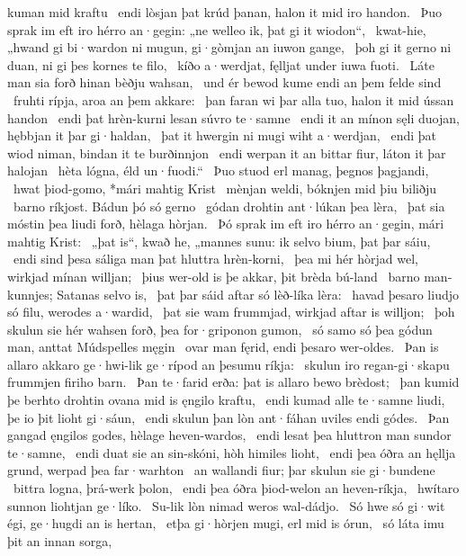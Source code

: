 kuman mid kraftu \hld\ endi lòsjan þat krúd þanan,
halon it mid iro handon. \hld\ Þuo sprak im eft iro hérro an·gegin:
„ne welleo ik, þat gi it wiodon“, \hld\ kwat-hie, „hwand gi bi·wardon ni mugun,
gi·gòmjan an iuwon gange, \hld\ þoh gi it gerno ni duan,
ni gi þes kornes te filo, \hld\ kíðo a·werdjat,
fęlljat under iuwa fuoti. \hld\ Láte man sia forð hinan
bèðju wahsan, \hld\ und ér bewod kume
endi an þem felde sind \hld\ fruhti rípja,
aroa an þem akkare: \hld\ þan faran wi þar alla tuo,
halon it mid ússan handon \hld\ endi þat hrèn-kurni lesan
súvro te·samne \hld\ endi it an mínon sęli duojan,
hębbjan it þar gi·haldan, \hld\ þat it hwergin ni mugi
wiht a·werdjan, \hld\ endi þat wiod niman,
bindan it te burðinnjon \hld\ endi werpan it an bittar fiur,
láton it þar halojan \hld\ hèta lógna,
éld un·fuodi.“ \hld\ Þuo stuod erl manag,
þegnos þagjandi, \hld\ hwat þiod-gomo,
*mári mahtig Krist \hld\ mènjan weldi,
bóknjen mid þiu biliðju \hld\ barno ríkjost.
Bádun þó só gerno \hld\ gódan drohtin
ant·lúkan þea lèra, \hld\ þat sia móstin þea liudi forð,
hèlaga hòrjan. \hld\ Þó sprak im eft iro hérro an·gegin,
mári mahtig Krist: \hld\ „þat is“, kwað he, „mannes sunu:
ik selvo bium, þat þar sáiu, \hld\ endi sind þesa sáliga man
þat hluttra hrèn-korni, \hld\ þea mi hér hòrjad wel,
wirkjad mínan willjan; \hld\ þius wer-old is þe akkar,
þit brèda bú-land \hld\ barno man-kunnjes;
Satanas selvo is, \hld\ þat þar sáid aftar
só lèð-líka lèra: \hld\ havad þesaro liudjo só filu,
werodes a·wardid, \hld\ þat sie wam frummjad,
wirkjad aftar is willjon; \hld\ þoh skulun sie hér wahsen forð,
þea for·griponon gumon, \hld\ só samo só þea gódun man,
anttat Múdspelles męgin \hld\ ovar man fęrid,
endi þesaro wer-oldes. \hld\ Þan is allaro akkaro ge·hwi-lik
ge·rípod an þesumu ríkja: \hld\ skulun iro regan-gi·skapu
frummjen firiho barn. \hld\ Þan te·farid erða:
þat is allaro bewo brèdost; \hld\ þan kumid þe berhto drohtin
ovana mid is ęngilo kraftu, \hld\ endi kumad alle te·samne
liudi, þe io þit lioht gi·sáun, \hld\ endi skulun þan lòn ant·fáhan
uviles endi gódes. \hld\ Þan gangad ęngilos godes,
hèlage heven-wardos, \hld\ endi lesat þea hluttron man
sundor te·samne, \hld\ endi duat sie an sin-skóni,
hòh himiles lioht, \hld\ endi þea óðra an hęllja grund,
werpad þea far·warhton \hld\ an wallandi fiur;
þar skulun sie gi·bundene \hld\ bittra logna,
þrá-werk þolon, \hld\ endi þea óðra þiod-welon
an heven-ríkja, \hld\ hwítaro sunnon
liohtjan ge·líko. \hld\ Su-lik lòn nimad
weros wal-dádjo. \hld\ Só hwe só gi·wit égi,
ge·hugdi an is hertan, \hld\ etþa gi·hòrjen mugi,
erl mid is órun, \hld\ só láta imu þit an innan sorga,
